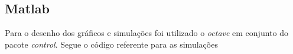 \documentclass[a4paper,11pt]{article}
\begin{document}
\inputminted[xleftmargin=15pt,linenos,frame=single,framesep=5pt]{python}{../python/exsim2.py}

\subsection{Matlab}

Para o desenho dos gráficos e simulações foi utilizado o \textit{octave} em conjunto do pacote \textit{control}. Segue o código referente para as simulações



\end{document}
